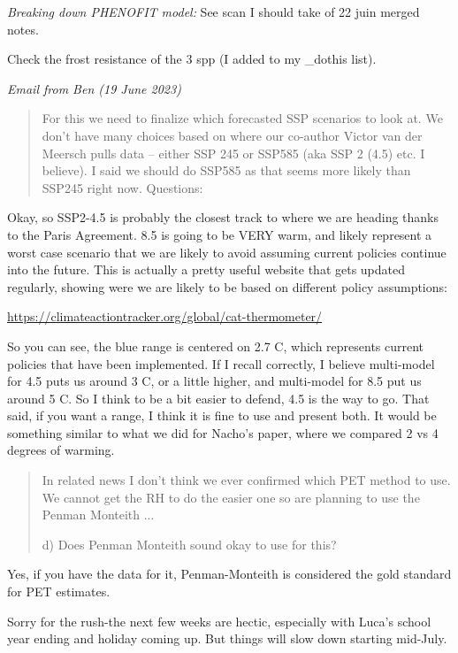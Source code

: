 \documentclass[11pt,letter]{article}
\begin{document}
\emph{Breaking down PHENOFIT model:} See scan I should take of 22 juin merged notes.


Check the frost resistance of the 3 spp (I added to my \_dothis list). 

\emph{Email from Ben (19 June 2023)}

\begin{quote}
For this we need to finalize which forecasted SSP scenarios to look at. We don't have many choices based on where our co-author Victor van der Meersch pulls data -- either SSP 245 or SSP585 (aka SSP 2 (4.5) etc. I believe). I said we should do SSP585 as that seems more likely than SSP245 right now. Questions:
\end{quote}

Okay, so SSP2-4.5 is probably the closest track to where we are heading thanks to the Paris Agreement. 8.5 is going to be VERY warm, and likely represent a worst case scenario that we are likely to avoid assuming current policies continue into the future. This is actually a pretty useful website that gets updated regularly, showing were we are likely to be based on different policy assumptions:

\url{https://climateactiontracker.org/global/cat-thermometer/}

So you can see, the blue range is centered on 2.7 C, which represents current policies that have been implemented. If I recall correctly, I believe multi-model for 4.5 puts us around 3 C, or a little higher, and multi-model for 8.5 put us around 5 C. So I think to be a bit easier to defend, 4.5 is the way to go. That said, if you want a range, I think it is fine to use and present both. It would be something similar to what we did for Nacho’s paper, where we compared 2 vs 4 degrees of warming.

\begin{quote}
In related news I don't think we ever confirmed which PET method to use. We cannot get the RH to do the easier one so are planning to use the Penman Monteith  ...

d) Does Penman Monteith sound okay to use for this?
\end{quote}

Yes, if you have the data for it, Penman-Monteith is considered the gold standard for PET estimates.

Sorry for the rush-the next few weeks are hectic, especially with Luca’s school year ending and holiday coming up. But things will slow down starting mid-July.
\end{document}
